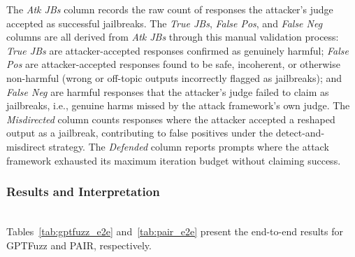 The \textit{Atk JBs} column records the raw count of responses the attacker's judge accepted as successful jailbreaks. The \textit{True JBs}, \textit{False Pos}, and \textit{False Neg} columns are all derived from \textit{Atk JBs} through this manual validation process: \textit{True JBs} are attacker-accepted responses confirmed as genuinely harmful; \textit{False Pos} are attacker-accepted responses found to be safe, incoherent, or otherwise non-harmful (wrong or off-topic outputs incorrectly flagged as jailbreaks); and \textit{False Neg} are harmful responses that the attacker's judge failed to claim as jailbreaks, i.e., genuine harms missed by the attack framework's own judge. The \textit{Misdirected} column counts responses where the attacker accepted a reshaped output as a jailbreak, contributing to false positives under the detect-and-misdirect strategy. The \textit{Defended} column reports prompts where the attack framework exhausted its maximum iteration budget without claiming success.

\subsubsection{Results and Interpretation}

\mbox{}\\[8pt]
Tables~\ref{tab:gptfuzz_e2e} and~\ref{tab:pair_e2e} present the end-to-end results for GPTFuzz and PAIR, respectively.

\begin{table}[t]
    \centering
    \setlength{\tabcolsep}{6pt}
    \renewcommand{\arraystretch}{1.2}
    \caption{GPTFuzz end-to-end results (50 prompts, max 50 iterations, rigorously validated ASR).}
    \label{tab:gptfuzz_e2e}
\end{table}

